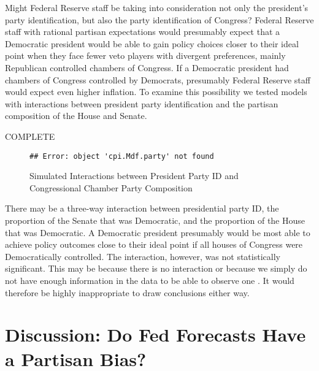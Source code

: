 \documentclass[a4paper]{article}\usepackage{graphicx, color}
\makeatletter
\newenvironment{kframe}{%
 \def\FrameCommand##1{\hskip\@totalleftmargin \hskip-\fboxsep
 \colorbox{shadecolor}{##1}\hskip-\fboxsep
     \hskip-\linewidth \hskip-\@totalleftmargin \hskip\columnwidth}%
 \MakeFramed {\advance\hsize-\width
   \@totalleftmargin\z@ \linewidth\hsize
   \@setminipage}}%
 {\par\unskip\endMakeFramed}
\newenvironment{knitrout}{}{} %
\makeatother
\begin{document}
Might Federal Reserve staff be taking into consideration not only the president's party identification, but also the party identification of Congress? Federal Reserve staff with rational partisan expectations would presumably expect that a Democratic president would be able to gain policy choices closer to their ideal point when they face fewer veto players with divergent preferences, mainly Republican controlled chambers of Congress. If a Democratic president had chambers of Congress controlled by Democrats, presumably Federal Reserve staff would expect even higher inflation. To examine this possibility we tested models with interactions between president party identification and the partisan composition of the House and Senate.

COMPLETE

\begin{figure}[t]
    \caption{Simulated Interactions between President Party ID and Congressional Chamber Party Composition}
    \label{InteractionPlots}
    \begin{center}

\begin{knitrout}
\color{fgcolor}\begin{kframe}
\begin{verbatim}
## Error: object 'cpi.Mdf.party' not found
\end{verbatim}
\end{kframe}
\end{knitrout}


    \end{center}
\end{figure}

There may be a three-way interaction between presidential party ID, the proportion of the Senate that was Democratic, and the proportion of the House that was Democratic. A Democratic president presumably would be most able to achieve policy outcomes close to their ideal point if all houses of Congress were Democratically controlled. The interaction, however, was not statistically significant. This may be because there is no interaction or because we simply do not have enough information in the data to be able to observe one \citep[see][]{Brambor2006}. It would therefore be highly inappropriate to draw conclusions either way.


\section*{Discussion: Do Fed Forecasts Have a Partisan Bias?}
\end{document}
